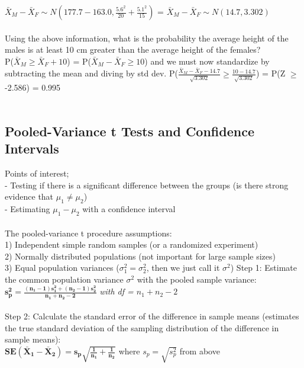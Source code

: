 \documentclass[12pt, a4paper]{article}
\begin{document}
	$\bar{X}_M - \bar{X}_F \sim N(177.7-163.0, \frac{5.6^2}{20} + \frac{5.1^2}{15})$ = $\bar{X}_M - \bar{X}_F \sim N(14.7,3.302)$ \\~\\
	Using the above information, what is the probability the average height of the males is at least 10 cm greater than the average height of the females? \\
	P($\bar{X}_M \geq \bar{X}_F + 10$) = P($\bar{X}_M - \bar{X}_F \geq 10$) and we must now standardize by subtracting the mean and diving by std dev. P($\frac{\bar{X}_M - \bar{X}_F - 14.7}{\sqrt{3.302}} \geq \frac{10 - 14.7}{\sqrt{3.302}}$) = P(Z $\geq$ -2.586) = 0.995 \\~\\
	
	\subsection{Pooled-Variance t Tests and Confidence Intervals}
	Points of interest; \\
	- Testing if there is a significant difference between the groups (is there strong evidence that \hspace*{2mm} $\mu_1 \neq \mu_2$) \\
	- Estimating $\mu_1 - \mu_2$ with a confidence interval \\~\\
	The pooled-variance t procedure assumptions: \\
	1) Independent simple random samples (or a randomized experiment) \\
	2) Normally distributed populations (not important for large sample sizes) \\
	3) Equal population variances ($\sigma_1^2 = \sigma_2^2$, then we just call it $\sigma^2$) \newpage
	\noindent Step 1: Estimate the common population variance $\sigma^2$ with the pooled sample variance: \\
	\hspace*{15mm} $\bm{s^2_p = \frac{(n_1-1)s^2_1 + (n_2-1)s^2_2}{n_1 + n_2 - 2}}$ \textit{with df = $n_1 + n_2 - 2$}\\~\\
	Step 2: Calculate the standard error of the difference in sample means (estimates the true \hspace*{15mm} standard deviation of the sampling distribution of the difference in sample means): \\
	\hspace*{15mm} $\bm{SE(\bar{X}_1 - \bar{X}_2) = s_p\sqrt{\frac{1}{n_1} + \frac{1}{n_2}}}$ where $s_p = \sqrt{s_p^2}$ from above \\~\\
\end{document}
